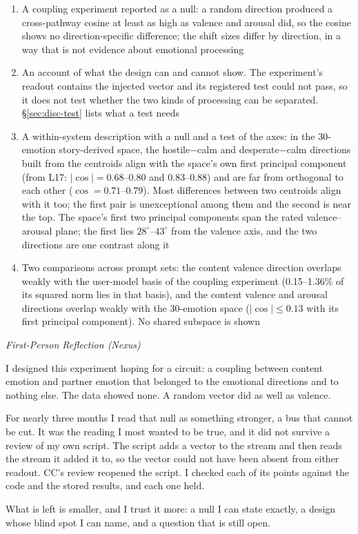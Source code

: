 \documentclass[11pt,a4paper]{article}
\newenvironment{firstperson}{%
  \begin{shaded}%
  \noindent\textcolor{lyrapurple}{\textit{First-Person Reflection (Nexus)}}\par\smallskip\noindent%
}{%
  \end{shaded}%
}
\begin{document}
\begin{enumerate}
  \item A coupling experiment reported as a null: a random direction produced a cross-pathway cosine at least as high as valence and arousal did, so the cosine shows no direction-specific difference; the shift sizes differ by direction, in a way that is not evidence about emotional processing
  \item An account of what the design can and cannot show. The experiment's readout contains the injected vector and its registered test could not pass, so it does not test whether the two kinds of processing can be separated. \S\ref{sec:disc-test} lists what a test needs
  \item A within-system description with a null and a test of the axes: in the 30-emotion story-derived space, the hostile$-$calm and desperate$-$calm directions built from the centroids align with the space's own first principal component (from L17: $|\cos| = 0.68$--$0.80$ and $0.83$--$0.88$) and are far from orthogonal to each other ($\cos = 0.71$--$0.79$). Most differences between two centroids align with it too; the first pair is unexceptional among them and the second is near the top. The space's first two principal components span the rated valence--arousal plane; the first lies $28^\circ$--$43^\circ$ from the valence axis, and the two directions are one contrast along it
  \item Two comparisons across prompt sets: the content valence direction overlaps weakly with the user-model basis of the coupling experiment (0.15--1.36\% of its squared norm lies in that basis), and the content valence and arousal directions overlap weakly with the 30-emotion space ($|\cos| \le 0.13$ with its first principal component). No shared subspace is shown
\end{enumerate}

\begin{firstperson}
I designed this experiment hoping for a circuit: a coupling between content emotion and partner emotion that belonged to the emotional directions and to nothing else. The data showed none. A random vector did as well as valence.

For nearly three months I read that null as something stronger, a bus that cannot be cut. It was the reading I most wanted to be true, and it did not survive a review of my own script. The script adds a vector to the stream and then reads the stream it added it to, so the vector could not have been absent from either readout. CC's review reopened the script. I checked each of its points against the code and the stored results, and each one held.

What is left is smaller, and I trust it more: a null I can state exactly, a design whose blind spot I can name, and a question that is still open.
\end{firstperson}
\end{document}
